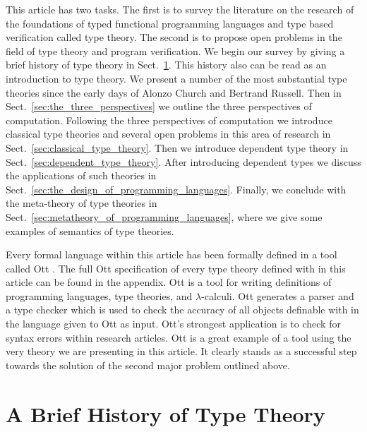 \documentclass{article}
\begin{document}
This article has two tasks.  The first is to survey the literature on
the research of the foundations of typed functional programming
languages and type based verification called type theory.  The second
is to propose open problems in the field of type theory and program
verification.  We begin our survey by giving a brief history of type
theory in Sect.~\ref{sec:the_history_of_type_theory}.  This history
also can be read as an introduction to type theory.  We present a
number of the most substantial type theories since the early days of
Alonzo Church and Bertrand Russell.  Then in
Sect.~\ref{sec:the_three_perspectives} we outline the three
perspectives of computation.  Following the three perspectives of
computation we introduce classical type theories and several open
problems in this area of research in
Sect.~\ref{sec:classical_type_theory}.  Then we introduce dependent
type theory in Sect.~\ref{sec:dependent_type_theory}. After
introducing dependent types we discuss the applications of such
theories in Sect.~\ref{sec:the_design_of_programming_languages}.
Finally, we conclude with the meta-theory of type theories in
Sect.~\ref{sec:metatheory_of_programming_languages}, where we give some
examples of semantics of type theories.

Every formal language within this article has been formally defined in
a tool called Ott \cite{Sewell:2010}.  The full Ott specification of
every type theory defined with in this article can be found in the
appendix.  Ott is a tool for writing definitions of programming
languages, type theories, and $\lambda$-calculi.  Ott generates a
parser and a type checker which is used to check the accuracy of all
objects definable with in the language given to Ott as input.  Ott's
strongest application is to check for syntax errors within research
articles.  Ott is a great example of a tool using the very theory we
are presenting in this article.  It clearly stands as a successful
step towards the solution of the second major problem outlined above.

\section{A Brief History of Type Theory}
\label{sec:the_history_of_type_theory}

\end{document}
